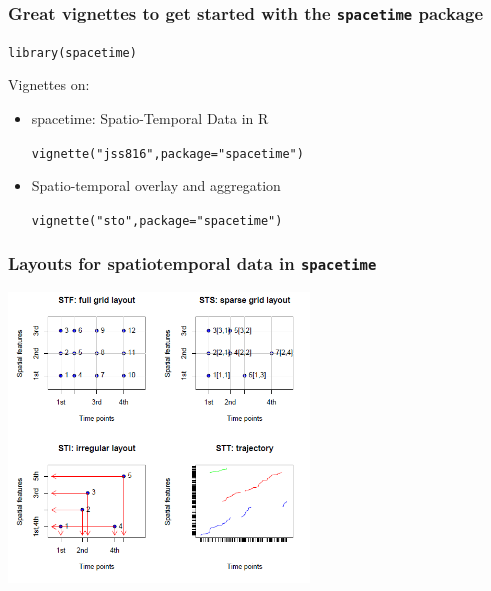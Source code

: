 \documentclass[xcolor=table, xcolor=dvipsnames]{beamer}\usepackage[]{graphicx}\usepackage[]{color}
\makeatletter
\newcommand{\hlstr}[1]{\textcolor[rgb]{0.545,0.137,0.137}{#1}}
\newcommand{\hlstd}[1]{\textcolor[rgb]{0,0,0}{#1}}
\newcommand{\hlkwc}[1]{\textcolor[rgb]{1,0,1}{#1}}
\newcommand{\hlkwd}[1]{\textcolor[rgb]{0,0,1}{#1}}
\newenvironment{kframe}{%
 \def\at@end@of@kframe{}%
 \ifinner\ifhmode%
  \def\at@end@of@kframe{\end{minipage}}%
  \begin{minipage}{\columnwidth}%
 \fi\fi%
 \def\FrameCommand##1{\hskip\@totalleftmargin \hskip-\fboxsep
 \colorbox{shadecolor}{##1}\hskip-\fboxsep
     \hskip-\linewidth \hskip-\@totalleftmargin \hskip\columnwidth}%
 \MakeFramed {\advance\hsize-\width
   \@totalleftmargin\z@ \linewidth\hsize
   \@setminipage}}%
 {\par\unskip\endMakeFramed%
 \at@end@of@kframe}
\newenvironment{knitrout}{}{} %
\makeatother
\begin{document}
\begin{frame}[fragile]\frametitle{Great vignettes to get started with the \texttt{spacetime} package}
\begin{knitrout}
\color{fgcolor}\begin{kframe}
\begin{alltt}
\hlkwd{library}\hlstd{(spacetime)}
\end{alltt}
\end{kframe}
\end{knitrout}
Vignettes on:
\pause
\begin{itemize}[<+->]
\item spacetime: Spatio-Temporal Data in R
\begin{knitrout}
\color{fgcolor}\begin{kframe}
\begin{alltt}
\hlkwd{vignette}\hlstd{(}\hlstr{"jss816"}\hlstd{,} \hlkwc{package}\hlstd{=}\hlstr{"spacetime"}\hlstd{)}
\end{alltt}
\end{kframe}
\end{knitrout}
\item Spatio-temporal overlay and aggregation
\begin{knitrout}
\color{fgcolor}\begin{kframe}
\begin{alltt}
\hlkwd{vignette}\hlstd{(}\hlstr{"sto"}\hlstd{,} \hlkwc{package}\hlstd{=}\hlstr{"spacetime"}\hlstd{)}
\end{alltt}
\end{kframe}
\end{knitrout}
\end{itemize}
\end{frame}




\begin{frame}[fragile]\frametitle{Layouts for spatiotemporal data in \texttt{spacetime}}
\begin{center}
\includegraphics[width=0.6\textwidth]{./externalfig/spacetime_layouts.png}
\end{center}
\end{frame}


\end{document}
